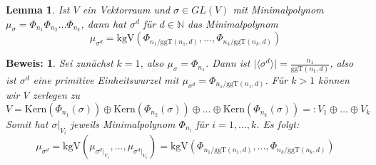 \documentclass[12pt,a4paper,halfparskip,headsepline,bibtotocnumbered]{scrreprt}
\theoremstyle{nummermitklammern}
\newtheorem{lemma}[defsatzusw]{Lemma}
\theoremstyle{nonumberbreak}
\newtheorem{beweis}{Beweis:}
\newcommand{\N}{\mathbb{N}}
\newcommand{\Kern}{\text{Kern}}
\newcommand{\ggT}{\text{ggT}}
\newcommand{\kgV}{\text{kgV}}
\begin{document}
\begin{framed}
	\begin{lemma}\label{lem:sigmaexpmipo}
		Ist $V$ ein Vektorraum und $\sigma \in GL(V)$ mit Minimalpolynom $\mu_\sigma = \Phi_{n_1} \Phi_{n_2} \dots \Phi_{n_k}$, dann hat $\sigma^d$ für $d \in \N$ das Minimalpolynom
		\begin{equation*}
			\mu_{\sigma^d} = \kgV(\Phi_{n_1 / \ggT(n_1, d)}, \dots, \Phi_{n_k / \ggT(n_k,d)})
		\end{equation*}
	\end{lemma}
\end{framed}

\begin{beweis}
	Sei zunächst $k=1$, also $\mu_\sigma = \Phi_{n_1}$. Dann ist $\vert \langle \sigma^d \rangle \vert = \frac{n_1}{\ggT(n_1,d)}$, also ist $\sigma^d$ eine primitive Einheitswurzel mit $\mu_{\sigma^d} = \Phi_{n_1/\ggT(n_1,d)}$.
	Für $k > 1$ können wir $V$ zerlegen zu 
	\begin{equation*}
		V = \Kern(\Phi_{n_1}(\sigma)) \oplus \Kern(\Phi_{n_2}(\sigma)) \oplus \dots \oplus \Kern(\Phi_{n_k}(\sigma)) =: V_1 \oplus \dots \oplus V_k
	\end{equation*}
	Somit hat $\sigma\vert_{V_i}$ jeweils Minimalpolynom $\Phi_{n_i}$ für $i=1,\dots, k$. Es folgt:
	\begin{equation*}
		\mu_{\sigma^d} = \kgV( \mu_{\sigma^d \vert_{V_1}}, \dots, \mu_{\sigma^d\vert_{V_k}}) = \kgV(\Phi_{n_1 / \ggT(n_1, d)}, \dots, \Phi_{n_k / \ggT(n_k,d)})
	\end{equation*}
\end{beweis}
\end{document}
